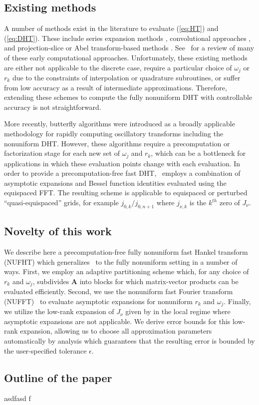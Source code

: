 \subsection*{Existing methods}
A number of methods exist in the literature to evaluate (\ref{eq:HT}) and
(\ref{eq:DHT}). These include series expansion methods
\cite{lord1954b,brunol1977fourier,cavanagh1979numerical},
convolutional approaches \cite{siegman1977quasi, johansen1979fast,
mook1983algorithm, liu1999nonuniform}, and projection-slice or Abel transform-based methods
\cite{oppenheim1980computation, hansen1985fast, kapur1995algorithm}.
See~\cite{cree1993algorithms} for a review of many of these early computational
approaches. Unfortunately, these existing methods are either not applicable to
the discrete case, require a particular choice of $\omega_j$ or $r_k$ due to the
constraints of interpolation or quadrature subroutines, or suffer from low
accuracy as a result of intermediate approximations. Therefore, extending these
schemes to compute the fully nonuniform DHT with controllable accuracy is not
straightforward.

More recently, butterfly algorithms \cite{oneil2010algorithm, li2015butterfly,
  pang2020interpolative} were introduced as a broadly applicable methodology for
rapidly computing oscillatory transforms including the nonuniform DHT. However,
these algorithms require a precomputation or factorization stage for each new
set of $\omega_j$ and $r_k$, which can be a bottleneck for applications in which
these evaluation points change with each evaluation. In order to provide a
precomputation-free fast DHT,~\cite{townsend2015fast} employs a combination of
asymptotic expansions and Bessel function identities evaluated using the
equispaced FFT. The resulting scheme is applicable to equispaced or perturbed
``quasi-equispaced'' grids, for example $j_{0,k} / j_{0,n+1}$ where $j_{\nu,k}$
is the $k^{th}$ zero of $J_\nu$.


\subsection*{Novelty of this work}


We describe here a precomputation-free fully nonuniform fast Hankel transform
(NUFHT) which generalizes~\cite{townsend2015fast} to the fully nonuniform setting in a number of ways. First, we
employ an adaptive partitioning scheme which, for any choice of $r_k$ and
$\omega_j$, subdivides $\bm{A}$ into blocks for which matrix-vector products can
be evaluated efficiently. Second, we use the nonuniform fast Fourier transform
(NUFFT)~\cite{dutt1993fast, greengard2004accelerating} to evaluate asymptotic
expansions for nonuniform $r_k$ and $\omega_j$. Finally, we utilize the low-rank
expansion of $J_\nu$ given by \cite{wimp1962polynomial} in the local regime
where asymptotic expansions are not applicable. We derive error bounds for this
low-rank expansion, allowing us to choose all approximation parameters
automatically by analysis which guarantees that the resulting error is bounded
by the user-specified tolerance $\epsilon$.



\subsection*{Outline of the paper}

asdfasd
f


